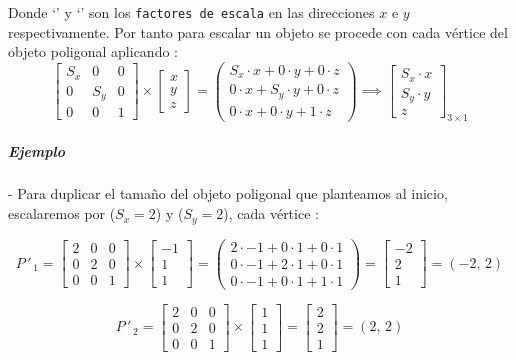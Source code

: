 \documentclass[10pt, twocolumn, landscape, a4paper]{article}
\begin{document}
\noindent Donde \;`'\; y \;`'\; son los {\tt factores de escala} en las direcciones $x$ e $y$ respectivamente. Por tanto para escalar un objeto se procede con cada vértice del objeto poligonal aplicando :
$$
\begin{bmatrix} S_{x} & 0 & 0 \\ 0 & S_{y} & 0 \\ 0 & 0 & 1 \end{bmatrix} \times \begin{bmatrix} x \\ y \\ z \end{bmatrix} = \begin{pmatrix} S_{x} \cdot x + 0 \cdot y + 0 \cdot z \\ 0 \cdot x + S_{y} \cdot y + 0 \cdot z \\ 0 \cdot x + 0 \cdot y + 1 \cdot z \end{pmatrix} \implies \begin{bmatrix} S_{x} \cdot x \\ S_{y} \cdot y \\ z \end{bmatrix}_{3{\times}1}  
$$

\subparagraph*{Ejemplo} - Para duplicar el tamaño del objeto poligonal que planteamos al inicio, escalaremos por ($S_{x} = 2$) y ($S_{y} = 2$), cada vértice :

$$P\,'_{\,1} = \begin{bmatrix} 2 & 0 & 0 \\ 0 & 2 & 0 \\ 0 & 0 & 1 \end{bmatrix} \times \begin{bmatrix} -1 \\ 1 \\ 1 \end{bmatrix} = \begin{pmatrix} 2 \cdot -1 + 0 \cdot 1 + 0 \cdot 1 \\ 0 \cdot -1 + 2 \cdot 1 + 0 \cdot 1 \\ 0 \cdot -1 + 0 \cdot 1 + 1 \cdot 1 \end{pmatrix} = \begin{bmatrix} -2 \\ 2 \\ 1 \end{bmatrix} = (-2,\,2)$$

$$P\,'_{\,2} = \begin{bmatrix} 2 & 0 & 0 \\ 0 & 2 & 0 \\ 0 & 0 & 1 \end{bmatrix} \times \begin{bmatrix} 1 \\ 1 \\ 1 \end{bmatrix} = \begin{bmatrix} 2 \\ 2 \\ 1 \end{bmatrix} = (2,\,2)$$
\end{document}
